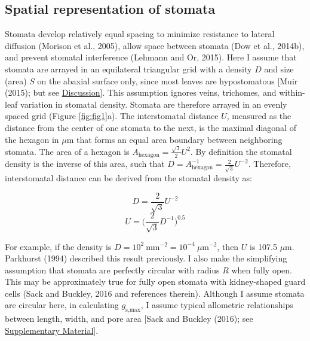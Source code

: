 \documentclass[utf8]{frontiersSCNS}
\newcommand{\gsmax}{$g_\text{s,max}$}
\begin{document}
\hypertarget{spatial-representation-of-stomata}{%
\subsection*{Spatial representation of
stomata}\label{spatial-representation-of-stomata}}

Stomata develop relatively equal spacing to minimize resistance to
lateral diffusion (Morison et al., 2005), allow space between stomata
(Dow et al., 2014b), and prevent stomatal interference (Lehmann and Or,
2015). Here I assume that stomata are arrayed in an equilateral
triangular grid with a density \(D\) and size (area) \(S\) on the
abaxial surface only, since most leaves are hypostomatous {[}Muir
(2015); but see \protect\hyperlink{discussion}{Discussion}{]}. This
assumption ignores veins, trichomes, and within-leaf variation in
stomatal density. Stomata are therefore arrayed in an evenly spaced grid
(Figure \ref{fig:fig1}a). The interstomatal distance \(U\), measured as
the distance from the center of one stomata to the next, is the maximal
diagonal of the hexagon in \(\mu\textrm{m}\) that forms an equal area
boundary between neighboring stomata. The area of a hexagon is
\(A_\textrm{hexagon} = \frac{\sqrt{3}}{2} U ^ 2\). By definition the
stomatal density is the inverse of this area, such that
\(D = A^{-1}_\textrm{hexagon} = \frac{2}{\sqrt{3}} U ^ {-2}\).
Therefore, interstomatal distance can be derived from the stomatal
density as:

\[ D = \frac{2}{\sqrt{3}} U ^{-2} \]
\[ U = \bigg(\frac{2}{\sqrt{3}} D ^{-1}\bigg) ^ {0.5} \]

For example, if the density is
\(D = 10 ^ 2~\textrm{mm}^{-2} = 10 ^ {-4}~\mu\textrm{m}^{-2}\), then
\(U\) is 107.5 \(\mu \textrm{m}\). Parkhurst (1994) described this
result previously. I also make the simplifying assumption that stomata
are perfectly circular with radius \(R\) when fully open. This may be
approximately true for fully open stomata with kidney-shaped guard cells
(Sack and Buckley, 2016 and references therein). Although I assume
stomata are circular here, in calculating \gsmax, I assume typical
allometric relationships between length, width, and pore area {[}Sack
and Buckley (2016); see
\protect\hyperlink{supplementary-material}{Supplementary Material}{]}.
\end{document}

